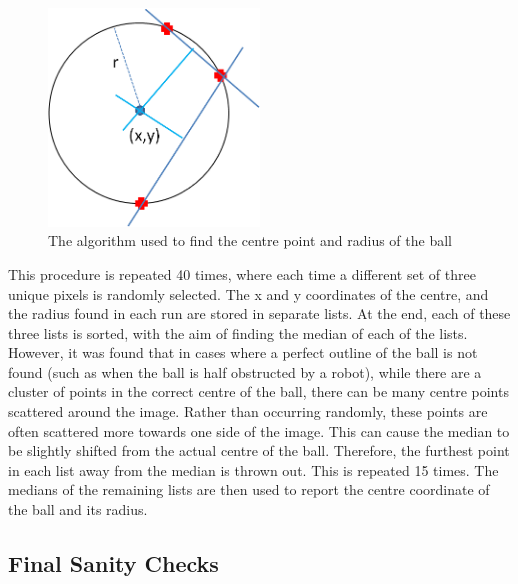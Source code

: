 \documentclass[pdftex,11pt,a4paper]{report}
\begin{document}
\begin{figure} [t]
\centering
\includegraphics[width=0.5\textwidth]{figures/ballCircleAlgorithm.png}
\caption{The algorithm used to find the centre point and radius of the ball} \label{fig:ballCircleAlgorithm}
\end{figure}

This procedure is repeated 40 times, where each time a different set of three unique pixels is randomly selected. The x and y coordinates of the centre, and the radius found in each run are stored in separate lists. At the end, each of these three lists is sorted, with the aim of finding the median of each of the lists. However, it was found that in cases where a perfect outline of the ball is not found (such as when the ball is half obstructed by a robot), while there are a cluster of points in the correct centre of the ball, there can be many centre points scattered around the image. Rather than occurring randomly, these points are often scattered more towards one side of the image. This can cause the median to be slightly shifted from the actual centre of the ball. Therefore, the furthest point in each list away from the median is thrown out. This is repeated 15 times. The medians of the remaining lists are then used to report the centre coordinate of the ball and its radius.

\subsection{Final Sanity Checks}
\end{document}
